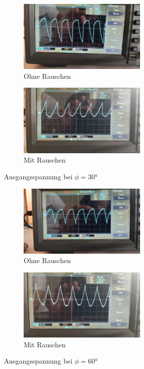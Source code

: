 \begin{figure}
    \begin{subfigure}{0.48 \textwidth}
        \centering
        \includegraphics[height = 3.5cm]{data_scripts/pics/30o.jpeg}
        \caption{Ohne Rauschen}
    \end{subfigure}
    \hfill
    \begin{subfigure}{0.48 \textwidth}
            \centering
            \includegraphics[height = 3.5cm]{data_scripts/pics/30m.jpeg}
            \caption{Mit Rauschen}
    \end{subfigure}
    \caption{Ausgangsspannung bei $\phi = \ang{30;;}$}
\end{figure}
\begin{figure}
    \begin{subfigure}{0.48 \textwidth}
        \centering
        \includegraphics[height = 3.5cm]{data_scripts/pics/60o.jpeg}
        \caption{Ohne Rauschen}
    \end{subfigure}
    \hfill
    \begin{subfigure}{0.48 \textwidth}
            \centering
            \includegraphics[height = 3.5cm]{data_scripts/pics/60m.jpeg}
            \caption{Mit Rauschen}
    \end{subfigure}
    \caption{Ausgangsspannung bei $\phi = \ang{60;;}$}
\end{figure}
